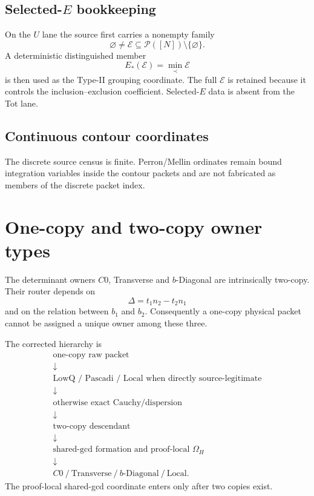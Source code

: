 \documentclass[11pt]{article}
\newcommand{\1}{\mathbf 1}
\begin{document}
\subsection{Selected-$E$ bookkeeping}
On the $U$ lane the source first carries a nonempty family
\[
 \varnothing\ne\mathcal E\subseteq\mathcal P([N])\setminus\{\varnothing\}.
\]
A deterministic distinguished member
\[
 E_*(\mathcal E)=\min_{\prec}\mathcal E
\]
is then used as the Type-II grouping coordinate. The full $\mathcal E$ is retained because it controls the inclusion--exclusion coefficient. Selected-$E$ data is absent from the Tot lane.

\subsection{Continuous contour coordinates}
The discrete source census is finite. Perron/Mellin ordinates remain bound integration variables inside the contour packets and are not fabricated as members of the discrete packet index.

\section{One-copy and two-copy owner types}
The determinant owners $C0$, Transverse and $b$-Diagonal are intrinsically two-copy. Their router depends on
\[
 \Delta=t_1n_2-t_2n_1
\]
and on the relation between $b_1$ and $b_2$. Consequently a one-copy physical packet cannot be assigned a unique owner among these three.

The corrected hierarchy is
\[
\begin{array}{c}
\text{one-copy raw packet}\\
\downarrow\\
\text{LowQ / Pascadi / Local when directly source-legitimate}\\
\downarrow\\
\text{otherwise exact Cauchy/dispersion}\\
\downarrow\\
\text{two-copy descendant}\\
\downarrow\\
\text{shared-gcd formation and proof-local }\Omega_H\\
\downarrow\\
C0\ /\ \text{Transverse}\ /\ b\text{-Diagonal}\ /\ \text{Local}.
\end{array}
\]
The proof-local shared-gcd coordinate enters only after two copies exist.
\end{document}
